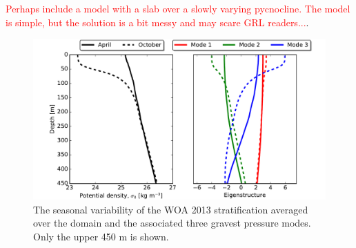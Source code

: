 \documentclass[grl]{agutex2015}
\begin{document}
\begin{article}
\textcolor{red}{Perhaps include a model with a slab over a slowly varying
pycnocline. The model is simple, but the solution is a bit messy and may
scare GRL readers...}.

\begin{figure}[ht]
   \begin{center}
     \includegraphics[width=1.\textwidth]{figs/fig_s3.pdf}
  \caption{The seasonal variability of the WOA 2013 stratification averaged  over
  the domain and the associated three gravest pressure modes. Only the upper 450 m is shown.}
  \label{figS3}
  \end{center}
\end{figure}


%
%
%
%
%
%



\end{article}
\end{document}
